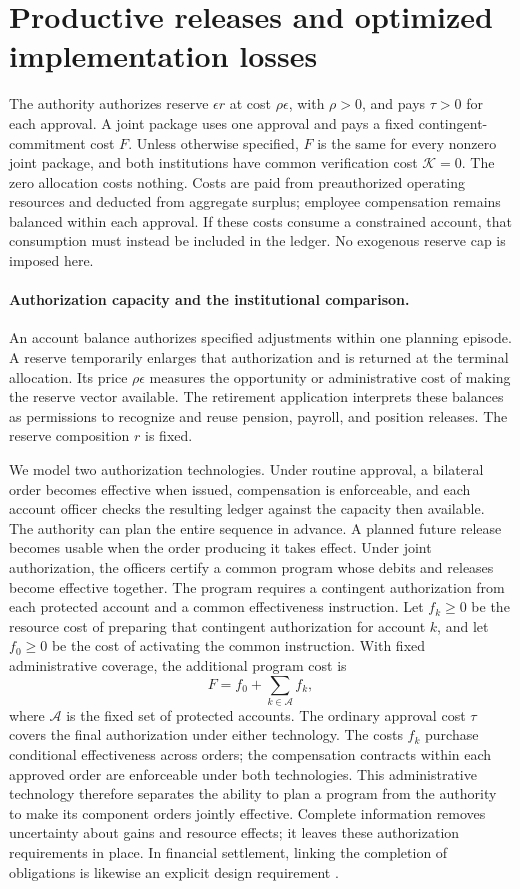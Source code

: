 \documentclass[ecta,draft]{econsocart}
\theoremstyle{definition}
\theoremstyle{definition}
\begin{document}
\section{Productive releases and optimized implementation losses}
The authority authorizes reserve $\epsilon r$ at cost $\rho\epsilon$, with
$\rho>0$, and pays $\tau>0$ for each approval. A joint package uses one
approval and pays a fixed contingent-commitment cost $F$. Unless otherwise
specified, $F$ is the same for every nonzero joint package, and both institutions
have common verification cost $\mathcal K=0$. The zero allocation costs nothing. Costs
are paid from preauthorized operating resources and deducted from aggregate
surplus; employee compensation remains balanced within each approval. If these
costs consume a constrained account, that consumption must instead be included
in the ledger. No exogenous reserve cap is imposed here.

\paragraph{Authorization capacity and the institutional comparison.}
An account balance authorizes specified adjustments within one planning
episode. A reserve temporarily enlarges that authorization and is returned
at the terminal allocation. Its price $\rho\epsilon$ measures the opportunity
or administrative cost of making the reserve vector available. The retirement
application interprets these balances as permissions to recognize and reuse
pension, payroll, and position releases. The reserve composition $r$ is fixed.

We model two authorization technologies. Under routine approval, a bilateral
order becomes effective when issued, compensation is enforceable, and each
account officer checks the resulting ledger against the capacity then
available. The authority can plan the entire sequence in advance. A planned
future release becomes usable when the order producing it takes effect.
Under joint authorization, the officers certify a common program whose
debits and releases become effective together. The program requires a
contingent authorization from each protected account and a common
effectiveness instruction. Let $f_k\geq0$ be the resource cost of preparing
that contingent authorization for account $k$, and let $f_0\geq0$ be the cost
of activating the common instruction. With fixed administrative coverage,
the additional program cost is
\[
 F=f_0+\sum_{k\in\mathcal A}f_k,
\]
where $\mathcal A$ is the fixed set of protected accounts.
The ordinary approval cost $\tau$ covers the final authorization under either
technology. The costs $f_k$ purchase conditional effectiveness across orders;
the compensation contracts within each approved order are enforceable under
both technologies. This administrative technology therefore separates the
ability to plan a program from the authority to make its component orders
jointly effective. Complete information removes uncertainty about gains and
resource effects; it leaves these authorization requirements in place.
In financial settlement, linking the completion of
obligations is likewise an explicit design requirement
\citep[Principle~12]{CPSSIOSCO2012}.
\end{document}
